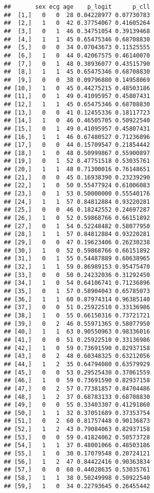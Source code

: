 \documentclass[]{article}
\begin{document}
\begin{verbatim}
##       sex ecg age    p_logit      p_cll
##  [1,]   0   0  28 0.04228977 0.07730783
##  [2,]   1   0  42 0.37754067 0.41605264
##  [3,]   0   1  46 0.34751054 0.39139468
##  [4,]   1   1  45 0.65475346 0.68708830
##  [5,]   0   0  34 0.07043673 0.11525555
##  [6,]   1   0  44 0.42067575 0.46140070
##  [7,]   0   1  48 0.38936077 0.43515790
##  [8,]   1   1  45 0.65475346 0.68708830
##  [9,]   0   0  38 0.09796880 0.14958069
## [10,]   1   0  45 0.44275215 0.48503186
## [11,]   0   1  49 0.41095957 0.45807431
## [12,]   1   1  45 0.65475346 0.68708830
## [13,]   0   0  41 0.12455336 0.18117723
## [14,]   1   0  46 0.46505705 0.50922540
## [15,]   0   1  49 0.41095957 0.45807431
## [16,]   1   1  46 0.67480527 0.71236896
## [17,]   0   0  44 0.15709547 0.21854442
## [18,]   1   0  48 0.50999867 0.55900897
## [19,]   0   1  52 0.47751518 0.53035761
## [20,]   1   1  48 0.71300016 0.76148651
## [21,]   0   0  45 0.16938390 0.23239290
## [22,]   1   0  50 0.55477924 0.61006083
## [23,]   0   1  53 0.50000000 0.55540176
## [24,]   1   1  57 0.84812884 0.93220281
## [25,]   0   0  46 0.18242552 0.24697287
## [26,]   1   0  52 0.59868766 0.66151892
## [27,]   0   1  54 0.52248482 0.58077950
## [28,]   1   1  57 0.84812884 0.93220281
## [29,]   0   0  47 0.19623406 0.26230238
## [30,]   1   0  52 0.59868766 0.66151892
## [31,]   0   1  55 0.54487889 0.60638965
## [32,]   1   1  59 0.86989153 0.95475470
## [33,]   0   0  50 0.24232036 0.31292450
## [34,]   1   0  54 0.64106741 0.71236896
## [35,]   0   1  57 0.58904043 0.65785073
## [36,]   1   1  60 0.87974314 0.96385140
## [37,]   0   0  51 0.25922510 0.33136986
## [38,]   1   0  55 0.66150316 0.73721721
## [39,]   0   2  46 0.55971365 0.58077950
## [40,]   1   1  63 0.90550963 0.98336016
## [41,]   0   0  51 0.25922510 0.33136986
## [42,]   1   0  59 0.73691590 0.82937158
## [43,]   0   2  48 0.60348325 0.63212056
## [44,]   1   2  35 0.64794080 0.63579929
## [45,]   0   0  53 0.29525430 0.37061559
## [46,]   1   0  59 0.73691590 0.82937158
## [47,]   0   2  57 0.77381857 0.84704486
## [48,]   1   2  37 0.68783133 0.68708830
## [49,]   0   0  55 0.33403307 0.41291860
## [50,]   1   1  32 0.37051689 0.37353754
## [51,]   0   2  60 0.81757448 0.90136873
## [52,]   1   2  43 0.79084063 0.82937158
## [53,]   0   0  59 0.41824062 0.50573728
## [54,]   1   1  37 0.48001066 0.48503186
## [55,]   1   0  30 0.17079548 0.20724121
## [56,]   1   2  47 0.84422416 0.90363834
## [57,]   0   0  60 0.44028635 0.53035761
## [58,]   1   1  38 0.50249998 0.50922540
## [59,]   1   0  34 0.22793645 0.26455442

\end{verbatim}
\end{document}
